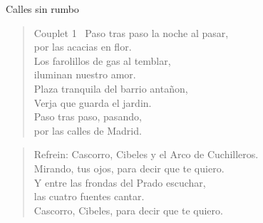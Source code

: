 	\begin{song}{Calles sin rumbo}
		
		\begin{instrumental}{}
			 \measure{}  \measure{}  \measure{} \measure{}  \measure{}  \measure{}  \measure{}   
		\end{instrumental}
		
		\begin{verse}{Couplet 1}	
			\ Paso tras paso la noche al pasar,\\
			por las acacias en flor.\\
			Los farolillos de gas al temblar,\\
			iluminan nuestro amor.	\\
			Plaza tranquila del barrio antañon,\\
			Verja que guarda el jardin.\\
			Paso tras paso, pasando,\\
			por las calles de Madrid.
		\end{verse}
		
		
		\begin{verse}{Refrein:}
Cascorro, Cibeles y el Arco de Cuchilleros.\\
Mirando, tus ojos, para decir que te 
quiero. \\ 
Y entre las frondas del Prado escuchar,\\
las cuatro fuentes cantar.\\
Cascorro, Cibeles, para decir que te quiero. \hspace{1.5em}


\end{verse}
\end{song}
